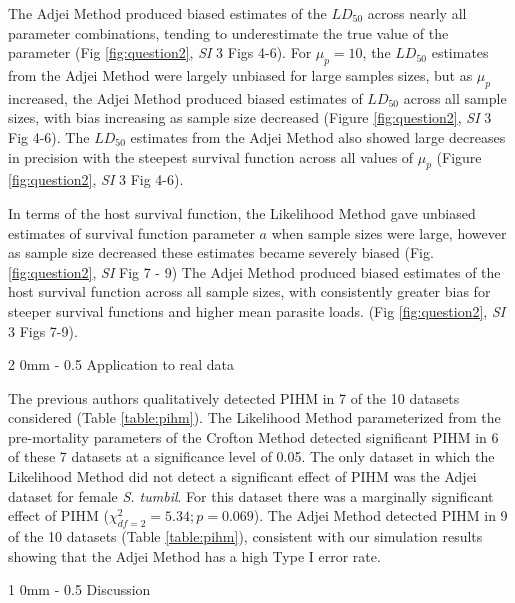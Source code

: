 \documentclass[12pt, a4paper]{article}
\makeatletter
\renewcommand{\section}{\@startsection
{section}%
{1}%
{0mm}%
{-\baselineskip}%
{0.5\baselineskip}%
{\normalfont\bf\large}} %
\renewcommand{\subsection}{\@startsection
{subsection}%
{2}%
{0mm}%
{-\baselineskip}%
{0.5\baselineskip}%
{\normalfont\bf}} %
\makeatother
\begin{document}
The Adjei Method produced biased estimates of the $LD_{50}$ across nearly all parameter combinations, tending to underestimate the true value of the parameter (Fig \ref{fig:question2}, \emph{SI} 3 Figs 4-6).  For $\mu_p = 10$, the $LD_{50}$
estimates from the Adjei Method were largely unbiased for large samples sizes, but as $\mu_p$ increased, the Adjei Method
produced biased estimates of $LD_{50}$ across all sample sizes, with bias
increasing as sample size decreased (Figure \ref{fig:question2}, \emph{SI} 3 Fig 4-6). The $LD_{50}$ estimates from the Adjei
Method also showed large decreases in precision with the steepest survival function across all values of $\mu_p$ (Figure \ref{fig:question2}, \emph{SI} 3 Fig 4-6).

In terms of the host survival function, the Likelihood Method gave unbiased estimates of survival function parameter $a$ when sample sizes were large, however as sample size decreased these estimates became severely biased (Fig. \ref{fig:question2}, \emph{SI} Fig 7 - 9) The Adjei Method produced
biased estimates of the host survival function across all sample sizes, with consistently greater bias for steeper survival functions and higher mean parasite loads. (Fig \ref{fig:question2}, \emph{SI} 3 Figs 7-9).

\subsection{Application to real data}

The previous authors qualitatively detected PIHM
in 7 of the 10 datasets considered (Table \ref{table:pihm}).  The Likelihood Method parameterized
from the pre-mortality parameters of the Crofton Method detected significant
PIHM in 6 of these 7 datasets at a significance level of 0.05.  The only
dataset in which the Likelihood Method did not detect a significant effect of PIHM was the Adjei dataset
for female \emph{S. tumbil}.  For this dataset there was a marginally significant effect
of PIHM ($\chi^2_{df=2} = 5.34; p = 0.069$). The Adjei Method detected PIHM in 9 of the 10 datasets (Table \ref{table:pihm}), consistent with our simulation results showing that the Adjei Method has a high Type I error rate.

\section{Discussion}
\end{document}
